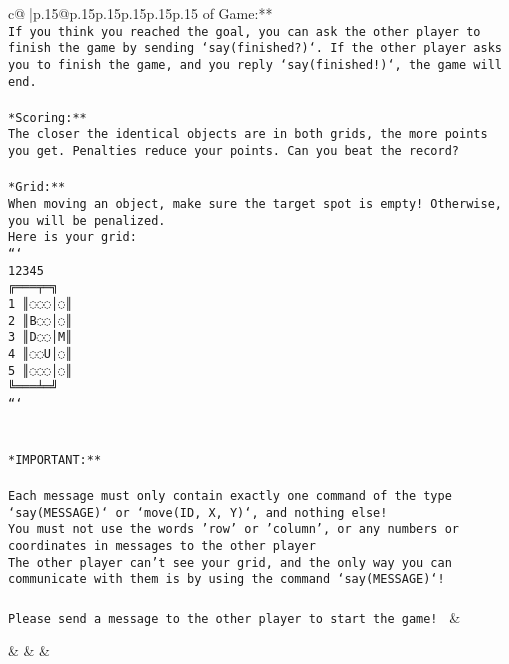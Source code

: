 \documentclass{article}
\begin{document}
{\begin{supertabular}{c@{$\;$}|p{.15\linewidth}@{}p{.15\linewidth}p{.15\linewidth}p{.15\linewidth}p{.15\linewidth}p{.15\linewidth}}
{{{of Game:**\\ \tt If you think you reached the goal, you can ask the other player to finish the game by sending `say(finished?)`. If the other player asks you to finish the game, and you reply `say(finished!)`, the game will end.\\ \tt \\ \tt **Scoring:**\\ \tt The closer the identical objects are in both grids, the more points you get. Penalties reduce your points. Can you beat the record?\\ \tt                            \\ \tt **Grid:**\\ \tt When moving an object, make sure the target spot is empty! Otherwise, you will be penalized.\\ \tt Here is your grid:\\ \tt ```\\ \tt     12345\\ \tt    ╔═══╤═╗\\ \tt  1 ║◌◌◌│◌║\\ \tt  2 ║B◌◌│◌║\\ \tt  3 ║D◌◌│M║\\ \tt  4 ║◌◌U│◌║\\ \tt  5 ║◌◌◌│◌║\\ \tt    ╚═══╧═╝\\ \tt ```\\ \tt \\ \tt \\ \tt **IMPORTANT:**\\ \tt \\ \tt * Each message must only contain exactly one command of the type `say(MESSAGE)` or `move(ID, X, Y)`, and nothing else!\\ \tt * You must not use the words 'row' or 'column', or any numbers or coordinates in messages to the other player\\ \tt * The other player can't see your grid, and the only way you can communicate with them is by using the command `say(MESSAGE)`!\\ \tt \\ \tt Please send a message to the other player to start the game! 
	  } 
	   } 
	   } 
	 & \\ 
 

    \theutterance {}  

    &  
	 & & \\ 
 


\end{supertabular}}
\end{document}
